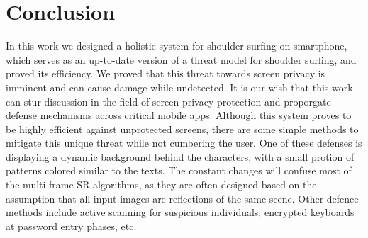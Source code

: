 
\section{Conclusion}
\label{sec-conclusion}
In this work we designed a holistic system for shoulder surfing on smartphone, which serves as an up-to-date version of a threat model for shoulder surfing, and proved its efficiency. We proved that this threat towards screen privacy is imminent and can cause damage while undetected. It is our wish that this work can stur discussion in the field of screen privacy protection and proporgate defense mechanisms across critical mobile apps. Although this system proves to be highly efficient against unprotected screens, there are some simple methods to mitigate this unique threat while not cumbering the user. One of these defenses is displaying a dynamic background behind the characters, with a small protion of patterns colored similar to the texts. The constant changes will confuse most of the multi-frame SR algorithms, as they are often designed based on the assumption that all input images are reflections of the same scene. Other defence methods include active scanning for suspicious individuals, encrypted keyboards at password entry phases, etc.